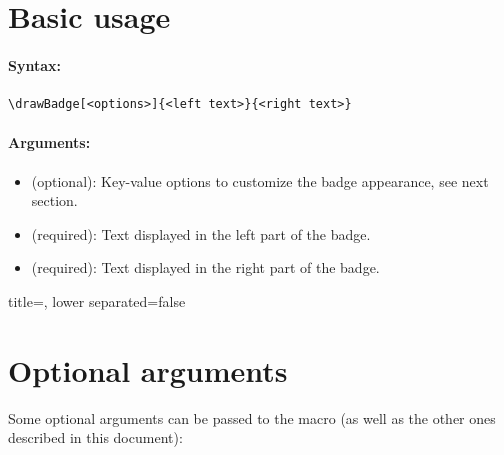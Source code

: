 \section{Basic usage}

\paragraph{Syntax:}
\begin{verbatim}
\drawBadge[<options>]{<left text>}{<right text>}
\end{verbatim}

\paragraph{Arguments:}
\begin{itemize}
    \item \mintex{[<options>]} (optional): Key-value options to customize the badge appearance, see next section.
    \item {} (required): Text displayed in the left part of the badge.
    \item {} (required): Text displayed in the right part of the badge.
\end{itemize}

\begin{tcblisting}{title={\tikzshields}, lower separated=false}
\end{tcblisting}


\section{Optional arguments}
\label{sec:args}

Some optional arguments can be passed to the macro \mintex{\drawBadge} (as well as the other ones described in this document):

